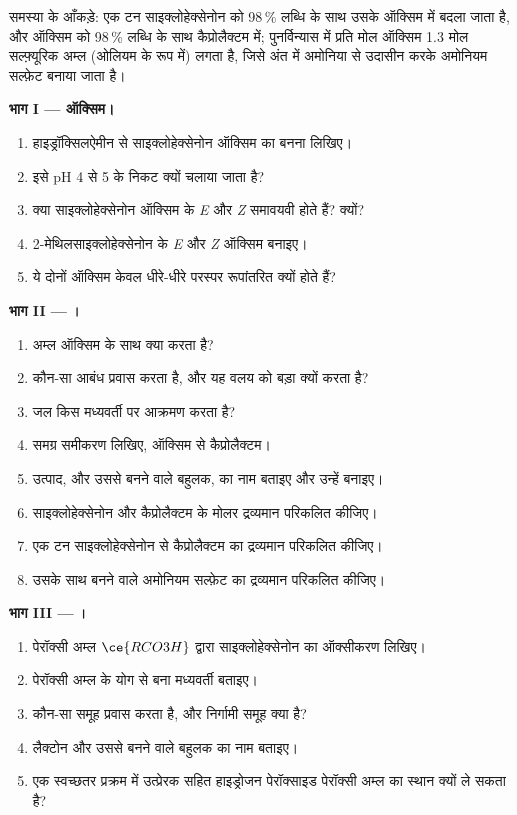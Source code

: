 \begin{problem}
\label{pb:b3:radicals-carbenes:1}
समस्या के आँकड़े: एक टन साइक्लोहेक्सेनोन को 98\,\% लब्धि के साथ उसके ऑक्सिम में बदला जाता है,
और ऑक्सिम को 98\,\% लब्धि के साथ कैप्रोलैक्टम में; पुनर्विन्यास में प्रति मोल ऑक्सिम
1.3 मोल सल्फ़्यूरिक अम्ल (ओलियम के रूप में) लगता है, जिसे अंत में
अमोनिया से उदासीन करके अमोनियम सल्फ़ेट बनाया जाता है।

\medskip\noindent\textbf{भाग I --- ऑक्सिम।}
\begin{enumerate}
  \item हाइड्रॉक्सिलऐमीन से साइक्लोहेक्सेनोन ऑक्सिम का बनना लिखिए।
  \item इसे pH 4 से 5 के निकट क्यों चलाया जाता है?
  \item क्या साइक्लोहेक्सेनोन ऑक्सिम के \textit{E} और \textit{Z} समावयवी होते हैं? क्यों?
  \item 2-मेथिलसाइक्लोहेक्सेनोन के \textit{E} और \textit{Z} ऑक्सिम बनाइए।
  \item ये दोनों ऑक्सिम केवल धीरे-धीरे परस्पर रूपांतरित क्यों होते हैं?
\end{enumerate}

\medskip\noindent\textbf{भाग II --- ।}
\begin{enumerate}[resume]
  \item अम्ल ऑक्सिम के साथ क्या करता है?
  \item कौन-सा आबंध प्रवास करता है, और यह वलय को बड़ा क्यों करता है?
  \item जल किस मध्यवर्ती पर आक्रमण करता है?
  \item समग्र समीकरण लिखिए, ऑक्सिम से कैप्रोलैक्टम।
  \item उत्पाद, और उससे बनने वाले बहुलक, का नाम बताइए और उन्हें बनाइए।
  \item साइक्लोहेक्सेनोन और कैप्रोलैक्टम के मोलर द्रव्यमान परिकलित कीजिए।
  \item एक टन साइक्लोहेक्सेनोन से कैप्रोलैक्टम का द्रव्यमान परिकलित कीजिए।
  \item उसके साथ बनने वाले अमोनियम सल्फ़ेट का द्रव्यमान परिकलित कीजिए।
\end{enumerate}

\medskip\noindent\textbf{भाग III --- ।}
\begin{enumerate}[resume]
  \item पेरॉक्सी अम्ल $\ce{RCO3H}$ द्वारा साइक्लोहेक्सेनोन का ऑक्सीकरण लिखिए।
  \item पेरॉक्सी अम्ल के योग से बना मध्यवर्ती बताइए।
  \item कौन-सा समूह प्रवास करता है, और निर्गामी समूह क्या है?
  \item लैक्टोन और उससे बनने वाले बहुलक का नाम बताइए।
  \item एक स्वच्छतर प्रक्रम में उत्प्रेरक सहित हाइड्रोजन पेरॉक्साइड पेरॉक्सी अम्ल का स्थान क्यों
        ले सकता है?
\end{enumerate}


\end{problem}
